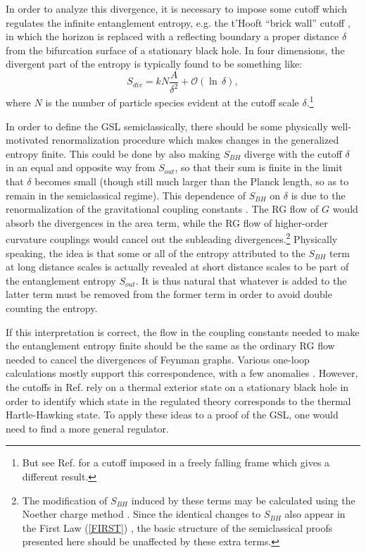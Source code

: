 \documentclass{article}
\begin{document}
In order to analyze this divergence, it is necessary to impose some cutoff which regulates the infinite entanglement entropy, e.g. the t'Hooft ``brick wall'' cutoff \cite{thooft85}, in which the horizon is replaced with a reflecting boundary a proper distance $\delta$ from the bifurcation surface of a stationary black hole.  In four dimensions, the divergent part of the entropy is typically found to be something like:
\begin{equation}
S_{div} = kN\frac{A}{\delta^2} + \mathcal{O}(\ln\,\delta),
\end{equation}
where $N$ is the number of particle species evident at the cutoff scale $\delta$.\footnote{But see Ref. \cite{JP07} for a cutoff imposed in a freely falling frame which gives a different result.}

In order to define the GSL semiclassically, there should be some physically well-motivated renormalization procedure which makes changes in the generalized entropy finite.  This could be done by also making $S_{BH}$ diverge with the cutoff $\delta$ in an equal and opposite way from $S_{out}$, so that their sum is finite in the limit that $\delta$ becomes small (though still much larger than the Planck length, so as to remain in the semiclassical regime).  This dependence of $S_{BH}$ on $\delta$ is due to the renormalization of the gravitational coupling constants \cite{jacobson94}.  The RG flow of $G$ would absorb the divergences in the area term, while the RG flow of higher-order curvature couplings would cancel out the subleading divergences.\footnote{The modification of $S_{BH}$ induced by these terms may be calculated using the Noether charge method \cite{wald93}.  Since the identical changes to $S_{BH}$ also appear in the First Law (\ref{FIRST}) \cite{JKM95}, the basic structure of the semiclassical proofs presented here should be unaffected by these extra terms.}  Physically speaking, the idea is that some or all of the entropy attributed to the $S_{BH}$ term at long distance scales is actually revealed at short distance scales to be part of the entanglement entropy $S_{out}$.  It is thus natural that whatever is added to the latter term must be removed from the former term in order to avoid double counting the entropy.

If this interpretation is correct, the flow in the coupling constants needed to make the entanglement entropy finite should be the same as the ordinary RG flow needed to cancel the divergences of Feynman graphs.  Various one-loop calculations mostly support this correspondence, with a few anomalies \cite{FS94}.  However, the cutoffs in Ref. \cite{FS94} rely on a thermal exterior state on a stationary black hole in order to identify which state in the regulated theory corresponds to the thermal Hartle-Hawking state.  To apply these ideas to a proof of the GSL, one would need to find a more general regulator.
\end{document}
